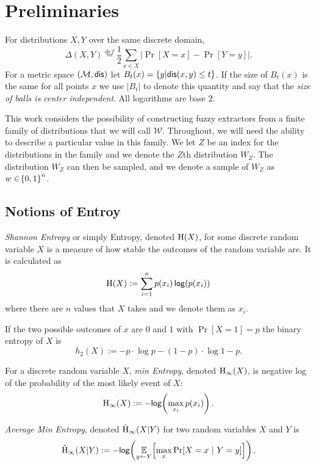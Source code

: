 
\section{Preliminaries}
\label{sec:prelim}
For distributions $X, Y$ over the same discrete domain,
\[
\Delta(X, Y)\overset{def}= \frac{1}{2}\sum_{x \in X} \left| \Pr[X=x] - \Pr[Y=y]\right|.
\]
For a metric space $(\mathcal{M}, \mathsf{dis})$ let $B_t(x) = \{y | \mathsf{dis}(x, y)\le t\}$. If the size of $B_t(x)$ is the same for all points $x$ we use $|B_t|$ to denote this quantity and say that the \emph{size of balls is center independent}.  All logarithms are base $2$.

This work considers the possibility of constructing fuzzy extractors from a finite family of distributions that we will call $\mathcal{W}$. 
Throughout, we will need the ability to describe a particular value in this family.  
We let $Z$ be an index for the distributions in the family and we denote the $Z$th distribution $W_Z$. 
The distribution $W_Z$ can then be sampled, and we denote a sample of $W_Z$ as $w \in \!\left\{ 0,1 \right\}^{n}$. 

\subsection{Notions of Entroy}

\begin{definition}[Entropy]
    \emph{Shannon Entropy} or simply Entropy, denoted $\mathrm{H}\!\left(X\right)$, for some discrete random variable $X$ is a measure of how stable the outcomes of the random variable are. It is calculated as \[\mathrm{H}\!\left(X\right) := \sum\limits_{i=1}^n p\!\left(x_i\right)\mathsf{log}\!\left(p\!\left(x_i\right)\right)\] where there are $n$ values that $X$ takes and we denote them as $x_i$. 
    
    If the two possible outcomes of $x$ are $0$ and $1$ with $\Pr[X=1] = p$ the binary entropy of $X$ is  \[h_2(X) :=-p\cdot\log{p} - (1-p)\cdot\log{1-p}.\] 
\end{definition}

\begin{definition}
For a discrete random variable $X$, 
    \emph{min Entropy}, denoted $\mathrm{H}_{\infty}\!\left(X\right)$, is negative log of the probability of the most likely event of $X$: \[\mathrm{H}_{\infty}\!\left(X\right) := -\mathsf{log}\!\left(\max\limits_{x_i} p(x_i)\right).\]  
\end{definition}

\begin{definition}
    \emph{Average Min Entropy}, denoted $\tilde{\mathrm{H}}_{\infty}\!\left(X|Y\right)$ for two random variables $X$ and $Y$ is \[ \tilde{\mathrm{H}}_{\infty}\!\left(X|Y\right) := -\mathsf{log}\!\left(\operatorname*{\mathbb{E}}\limits_{y \leftarrow Y}\!\left[\max\limits_{x} \Pr\!\left[X = x\ |\ Y = y\right]\right]\right).\] 
\end{definition}

